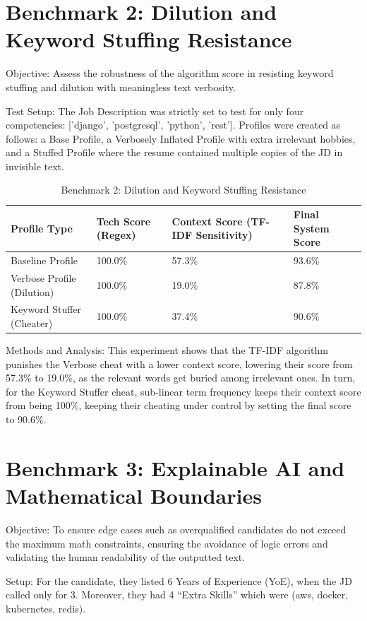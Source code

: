 \section{Benchmark 2: Dilution and Keyword Stuffing Resistance}
Objective: Assess the robustness of the algorithm score in resisting keyword stuffing and dilution with meaningless text verbosity.

Test Setup: The Job Description was strictly set to test for only four competencies: ['django', 'postgresql', 'python', 'rest']. Profiles were created as follows: a Base Profile, a Verbosely Inflated Profile with extra irrelevant hobbies, and a Stuffed Profile where the resume contained multiple copies of the JD in invisible text.

\begin{table}[H]
\centering
\caption{Benchmark 2: Dilution and Keyword Stuffing Resistance}
\begin{tabularx}{\textwidth}{p{}p{}p{}p{}}
\toprule
\textbf{Profile Type} & \textbf{Tech Score (Regex)} & \textbf{Context Score (TF-IDF Sensitivity)} & \textbf{Final System Score}\\
\midrule
Baseline Profile & 100.0\% & 57.3\% & 93.6\%\\
Verbose Profile (Dilution) & 100.0\% & 19.0\% & 87.8\%\\
Keyword Stuffer (Cheater) & 100.0\% & 37.4\% & 90.6\%\\
\bottomrule
\end{tabularx}
\end{table}

Methods and Analysis: This experiment shows that the TF-IDF algorithm punishes the Verbose cheat with a lower context score, lowering their score from 57.3\% to 19.0\%, as the relevant words get buried among irrelevant ones. In turn, for the Keyword Stuffer cheat, sub-linear term frequency keeps their context score from being 100\%, keeping their cheating under control by setting the final score to 90.6\%.

\section{Benchmark 3: Explainable AI and Mathematical Boundaries}
Objective: To ensure edge cases such as overqualified candidates do not exceed the maximum math constraints, ensuring the avoidance of logic errors and validating the human readability of the outputted text.

Setup: For the candidate, they listed 6 Years of Experience (YoE), when the JD called only for 3. Moreover, they had 4 ``Extra Skills'' which were (aws, docker, kubernetes, redis).

